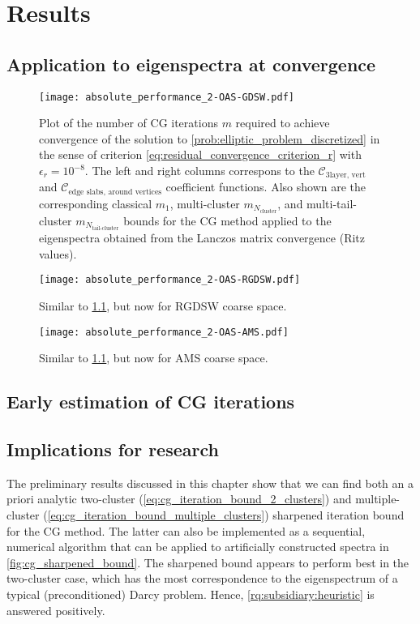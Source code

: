 \chapter{Results}\label{ch:results}

\section{Application to eigenspectra at convergence}
\begin{figure}[H]
    \centering
    \texttt{[image: absolute\_performance\_2-OAS-GDSW.pdf]}
    \caption{Plot of the number of CG iterations $m$ required to achieve convergence of the solution to \cref{prob:elliptic_problem_discretized} in the sense of criterion \cref{eq:residual_convergence_criterion_r} with $\epsilon_r=10^{-8}$. The left and right columns correspons to the $\mathcal{C}_{\text{3layer, vert}}$ and $\mathcal{C}_{\text{edge slabs, around vertices}}$ coefficient functions. Also shown are the corresponding classical $m_1$, multi-cluster $m_{N_{\text{cluster}}}$, and multi-tail-cluster $m_{N_{\text{tail-cluster}}}$ bounds for the CG method applied to the eigenspectra obtained from the Lanczos matrix convergence (Ritz values).}
    \label{fig:cg_bounds_gdsw}
\end{figure}

\begin{figure}
    \centering\texttt{[image: absolute\_performance\_2-OAS-RGDSW.pdf]}
    \caption{Similar to \cref{fig:cg_bounds_gdsw}, but now for RGDSW coarse space.}
    \label{fig:cg_bounds_rgdsw}
\end{figure}

\begin{figure}
    \centering\texttt{[image: absolute\_performance\_2-OAS-AMS.pdf]}
    \caption{Similar to \cref{fig:cg_bounds_gdsw}, but now for AMS coarse space.}
    \label{fig:cg_bounds_ams}
\end{figure}

\section{Early estimation of CG iterations}




\section{Implications for research}\label{sec:cg_sharpened_convrate_implications}
The preliminary results discussed in this chapter show that we can find both an a priori analytic two-cluster (\cref{eq:cg_iteration_bound_2_clusters}) and multiple-cluster (\cref{eq:cg_iteration_bound_multiple_clusters}) sharpened iteration bound for the CG method. The latter can also be implemented as a sequential, numerical algorithm that can be applied to artificially constructed spectra in \cref{fig:cg_sharpened_bound}. The sharpened bound appears to perform best in the two-cluster case, which has the most correspondence to the eigenspectrum of a typical (preconditioned) Darcy problem. Hence, \ref{rq:subsidiary:heuristic} is answered positively. 

